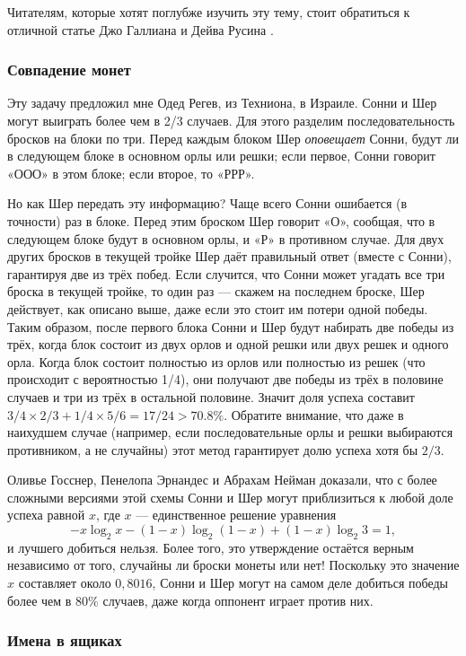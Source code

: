 Читателям, которые хотят поглубже изучить эту тему, стоит обратиться к отличной статье Джо Галлиана и Дейва Русина \cite{gallian-rusin}.

\subsubsection*{Совпадение монет}

Эту задачу предложил мне Одед Регев, из Техниона, в Израиле.
Сонни и Шер могут выиграть более чем в 2/3 случаев.
Для этого разделим последовательность бросков на блоки по три.
Перед каждым блоком Шер \emph{оповещает} Сонни, будут ли в следующем блоке в основном орлы или решки;
если первое, Сонни говорит «ООО» в этом блоке; если второе, то «РРР».

Но как Шер передать эту информацию?
Чаще всего Сонни ошибается (в точности) раз в блоке.
Перед этим броском Шер говорит «О», сообщая, что в следующем блоке будут в основном орлы, и «Р» в противном случае.
Для двух других бросков в текущей тройке Шер даёт правильный ответ (вместе с Сонни), гарантируя две из трёх побед.
Если случится, что Сонни может угадать все три броска в текущей тройке,
то один раз --- скажем на последнем броске, Шер действует, как описано выше, даже если это стоит им потери одной победы.
Таким образом, после первого блока Сонни и Шер будут набирать две победы из трёх, когда блок состоит из двух орлов и одной решки или двух решек и одного орла.
Когда блок состоит полностью из орлов или полностью из решек (что происходит с вероятностью 1/4), они получают две победы из трёх в половине случаев и три из трёх в остальной половине.
Значит доля успеха составит $3/4 \times 2/3 + 1/4 \times 5/6 = 17/24 > 70.8\%$.
Обратите внимание, что даже в наихудшем случае (например, если последовательные орлы и решки выбираются противником, а не случайны) этот метод гарантирует долю успеха хотя бы $2/3$.

Оливье Госснер, Пенелопа Эрнандес и Абрахам Нейман \cite{gossner} доказали, что с более сложными версиями этой схемы Сонни и Шер могут приблизиться к любой доле успеха равной $x$, где $x$ --- единственное решение уравнения
\[-x \log_2 x - (1 - x) \log_2 (1 - x) + (1 - x) \log_2 3 = 1,\]
и лучшего добиться нельзя.
Более того, это утверждение остаётся верным независимо от того, случайны ли броски монеты или нет!
Поскольку это значение $x$ составляет около $0{,}8016$, Сонни и Шер могут на самом деле добиться победы более чем в $80\%$ случаев, даже когда оппонент играет против них.

\subsubsection*{Имена в ящиках}

